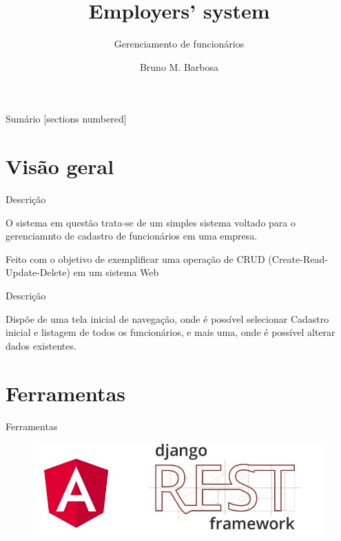 \documentclass[10pt]{beamer}
\title{Employers' system}
\subtitle{Gerenciamento de funcionários}
\date{}
\author{Bruno M. Barbosa}
\institute{Instituto de Computação}
\begin{document}
\maketitle

\begin{frame}{Sumário}
  [sections numbered]
  \tableofcontents[hideallsubsections]
\end{frame}

\section{Visão geral}

\begin{frame}[fragile]{Descrição}

  O sistema em questão trata-se de um simples sistema voltado para o gerenciamnto de cadastro de funcionários em uma empresa.
  
  Feito com o objetivo de exemplificar uma operação de CRUD (Create-Read-Update-Delete) em um sistema Web
  
\end{frame}

\begin{frame}[fragile]{Descrição}
  
  Dispõe de uma tela inicial de navegação, onde é possível selecionar Cadastro inicial e listagem de todos os funcionários, e mais uma, onde é possível alterar dados existentes.
  
\end{frame}

\section{Ferramentas}

\begin{frame}{Ferramentas}
	
	\begin{figure}
	    \centering
	    \includegraphics[scale=.3]{img/angular-rest.jpg}
	\end{figure}
	
\end{frame}
\end{document}
